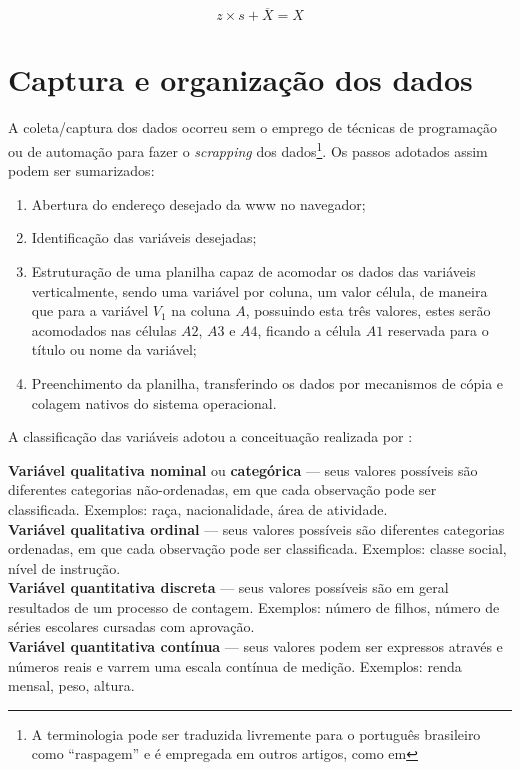 	\begin{equation}
	    z \times s + \overline{X} = X
	\end{equation}
	
	\section{Captura e organização dos dados}

	A coleta/captura dos dados ocorreu sem o emprego de técnicas de programação ou de automação para fazer o \textit{scrapping} dos dados\footnote{A terminologia pode ser traduzida livremente para o português brasileiro como ``raspagem'' e é empregada em outros artigos, como em }. Os passos adotados assim podem ser sumarizados:
	
	\begin{enumerate}
	    \item Abertura do endereço desejado da \gls{www} no navegador;
	    \item Identificação das variáveis desejadas;
	    \item Estruturação de uma planilha capaz de acomodar os dados das variáveis verticalmente, sendo uma variável por coluna, um valor célula, de maneira que para a variável $V_1$ na coluna $A$, possuindo esta três valores, estes serão acomodados nas células $A2$, $A3$ e $A4$, ficando a célula $A1$ reservada para o título ou nome da variável;
	    \item Preenchimento da planilha, transferindo os dados por mecanismos de cópia e colagem nativos do sistema operacional.
	\end{enumerate}

    A classificação das variáveis adotou a conceituação realizada por :
	
	\begin{citacao}
		\textbf{Variável qualitativa nominal} ou \textbf{categórica} --- seus valores possíveis são diferentes categorias não-ordenadas, em que cada observação pode ser classificada. Exemplos: raça, nacionalidade, área de atividade. \\
		\textbf{Variável qualitativa ordinal} --- seus valores possíveis são diferentes categorias ordenadas, em que cada observação pode ser classificada. Exemplos: classe social, nível de instrução. \\
		\textbf{Variável quantitativa discreta} --- seus valores possíveis são em geral resultados de um processo de contagem. Exemplos: número de filhos, número de séries escolares cursadas com aprovação. \\
		\textbf{Variável quantitativa contínua} --- seus valores podem ser expressos através e números reais e varrem uma escala contínua de medição. Exemplos: renda mensal, peso, altura.
	\end{citacao}
	

